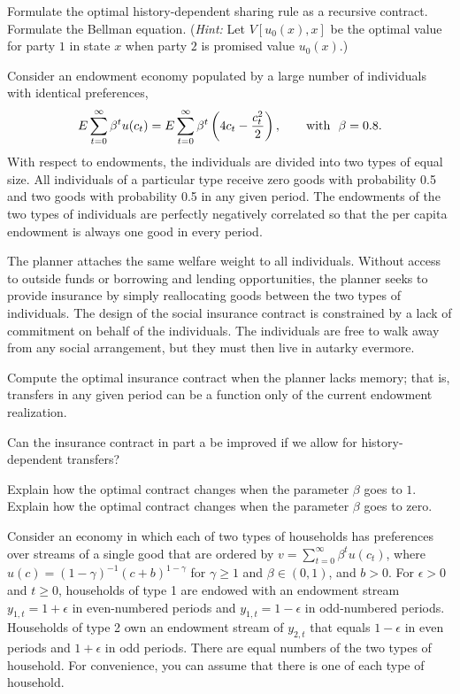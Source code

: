   Formulate the optimal history-dependent sharing rule as a
recursive contract.  Formulate the Bellman equation. %
({\it Hint:} Let $V[u_0(x),x]$ be the optimal value for party $1$ in
state $x$ when party $2$ is promised value $u_0(x)$.)

\medskip
{}
\medskip
\noindent
Consider an endowment economy populated by a large number of individuals
with identical preferences,
$$
E \sum_{t=0}^\infty \beta^t u(c_t) =
E \sum_{t=0}^\infty \beta^t \left(4 c_t - {c_t^2 \over 2}\right),
\qquad \hbox{with} \ \ \beta=0.8.
$$
With respect to endowments, the individuals are divided into two types of
equal size.  All individuals of a particular type receive zero goods with
probability 0.5 and two goods with probability 0.5 in any given period.
The endowments of the two types of individuals are perfectly
negatively correlated so that the per capita endowment is always one good in
every period.

The planner attaches the same welfare weight to all individuals.
Without access to outside funds or borrowing and lending
opportunities, the planner seeks to provide insurance by simply
reallocating goods between the two types of individuals. The
design of the social insurance contract is constrained by a lack
of commitment on behalf of the individuals. The individuals are
free to walk away from any social arrangement, but they must then
live in autarky evermore.

\medskip
{}   Compute the optimal insurance contract when
the planner lacks memory; that is, transfers in any given period
can be a function only of the current endowment realization.

\medskip
{} Can the insurance contract in part a be
improved if we allow for history-dependent transfers?

\medskip
{}  Explain how the optimal contract changes when the
parameter $\beta$ goes to $1$. Explain how the optimal contract
changes when the parameter $\beta$ goes to zero.

\medskip
{} 

\medskip
\noindent Consider an economy in which each of two types
of households has preferences over streams of
a single good that are ordered by
$ v= \sum_{t=0}^\infty \beta^t u(c_t) $, where
$u(c) = (1-\gamma)^{-1} (c+b)^{1-\gamma}$ for $\gamma \geq 1$ and
$\beta \in (0,1)$, and $b>0$.
For $\epsilon >0$ and $t\geq 0$,
households of type 1 are endowed with an endowment stream
$y_{1,t} = 1+\epsilon$ in even-numbered periods and
$y_{1,t}=1-\epsilon$ in odd-numbered periods.  Households
of type 2 own an endowment stream of  $y_{2,t}$ that
equals $1-\epsilon$ in even periods and $1+\epsilon$ in
odd periods.  There are equal numbers of the two types of household.
For convenience, you can assume that there is one of each type of
household.

